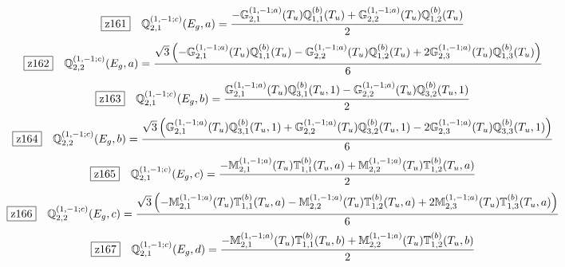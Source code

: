 \documentclass[fleqn,10pt,landscape]{jsarticle}
\begin{document}
\begin{dmath*}
\hspace*{3mm}\fbox{z161}\quad \mathbb{Q}_{2,1}^{(1,-1;c)}(E_{g},a)=\frac{- \mathbb{G}_{2,1}^{(1,-1;a)}(T_{u}) \mathbb{Q}_{1,1}^{(b)}(T_{u}) + \mathbb{G}_{2,2}^{(1,-1;a)}(T_{u}) \mathbb{Q}_{1,2}^{(b)}(T_{u})}{2}
\end{dmath*}
\begin{dmath*}
\hspace*{3mm}\fbox{z162}\quad \mathbb{Q}_{2,2}^{(1,-1;c)}(E_{g},a)=\frac{\sqrt{3} \left(- \mathbb{G}_{2,1}^{(1,-1;a)}(T_{u}) \mathbb{Q}_{1,1}^{(b)}(T_{u}) - \mathbb{G}_{2,2}^{(1,-1;a)}(T_{u}) \mathbb{Q}_{1,2}^{(b)}(T_{u}) + 2 \mathbb{G}_{2,3}^{(1,-1;a)}(T_{u}) \mathbb{Q}_{1,3}^{(b)}(T_{u})\right)}{6}
\end{dmath*}
\begin{dmath*}
\hspace*{3mm}\fbox{z163}\quad \mathbb{Q}_{2,1}^{(1,-1;c)}(E_{g},b)=\frac{\mathbb{G}_{2,1}^{(1,-1;a)}(T_{u}) \mathbb{Q}_{3,1}^{(b)}(T_{u},1) - \mathbb{G}_{2,2}^{(1,-1;a)}(T_{u}) \mathbb{Q}_{3,2}^{(b)}(T_{u},1)}{2}
\end{dmath*}
\begin{dmath*}
\hspace*{3mm}\fbox{z164}\quad \mathbb{Q}_{2,2}^{(1,-1;c)}(E_{g},b)=\frac{\sqrt{3} \left(\mathbb{G}_{2,1}^{(1,-1;a)}(T_{u}) \mathbb{Q}_{3,1}^{(b)}(T_{u},1) + \mathbb{G}_{2,2}^{(1,-1;a)}(T_{u}) \mathbb{Q}_{3,2}^{(b)}(T_{u},1) - 2 \mathbb{G}_{2,3}^{(1,-1;a)}(T_{u}) \mathbb{Q}_{3,3}^{(b)}(T_{u},1)\right)}{6}
\end{dmath*}
\begin{dmath*}
\hspace*{3mm}\fbox{z165}\quad \mathbb{Q}_{2,1}^{(1,-1;c)}(E_{g},c)=\frac{- \mathbb{M}_{2,1}^{(1,-1;a)}(T_{u}) \mathbb{T}_{1,1}^{(b)}(T_{u},a) + \mathbb{M}_{2,2}^{(1,-1;a)}(T_{u}) \mathbb{T}_{1,2}^{(b)}(T_{u},a)}{2}
\end{dmath*}
\begin{dmath*}
\hspace*{3mm}\fbox{z166}\quad \mathbb{Q}_{2,2}^{(1,-1;c)}(E_{g},c)=\frac{\sqrt{3} \left(- \mathbb{M}_{2,1}^{(1,-1;a)}(T_{u}) \mathbb{T}_{1,1}^{(b)}(T_{u},a) - \mathbb{M}_{2,2}^{(1,-1;a)}(T_{u}) \mathbb{T}_{1,2}^{(b)}(T_{u},a) + 2 \mathbb{M}_{2,3}^{(1,-1;a)}(T_{u}) \mathbb{T}_{1,3}^{(b)}(T_{u},a)\right)}{6}
\end{dmath*}
\begin{dmath*}
\hspace*{3mm}\fbox{z167}\quad \mathbb{Q}_{2,1}^{(1,-1;c)}(E_{g},d)=\frac{- \mathbb{M}_{2,1}^{(1,-1;a)}(T_{u}) \mathbb{T}_{1,1}^{(b)}(T_{u},b) + \mathbb{M}_{2,2}^{(1,-1;a)}(T_{u}) \mathbb{T}_{1,2}^{(b)}(T_{u},b)}{2}
\end{dmath*}
\end{document}
